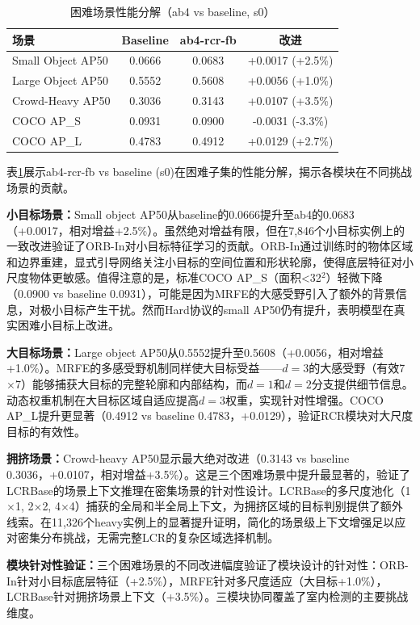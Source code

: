 \documentclass[journal]{IEEEtran}
\begin{document}
\begin{table}[t]
\caption{困难场景性能分解（ab4 vs baseline, s0）}
\label{tab:hard_breakdown}
\centering
\small
\begin{tabular}{lccc}
\toprule
\textbf{场景} & \textbf{Baseline} & \textbf{ab4-rcr-fb} & \textbf{改进} \\
\midrule
Small Object AP50 & 0.0666 & 0.0683 & +0.0017 (+2.5\%) \\
Large Object AP50 & 0.5552 & 0.5608 & +0.0056 (+1.0\%) \\
Crowd-Heavy AP50 & 0.3036 & 0.3143 & +0.0107 (+3.5\%) \\
COCO AP\_S & 0.0931 & 0.0900 & -0.0031 (-3.3\%) \\
COCO AP\_L & 0.4783 & 0.4912 & +0.0129 (+2.7\%) \\
\bottomrule
\end{tabular}
\end{table}

表\ref{tab:hard_breakdown}展示ab4-rcr-fb vs baseline (s0)在困难子集的性能分解，揭示各模块在不同挑战场景的贡献。

\textbf{小目标场景：}Small object AP50从baseline的0.0666提升至ab4的0.0683（+0.0017，相对增益+2.5\%）。虽然绝对增益有限，但在7,846个小目标实例上的一致改进验证了ORB-In对小目标特征学习的贡献。ORB-In通过训练时的物体区域和边界重建，显式引导网络关注小目标的空间位置和形状轮廓，使得底层特征对小尺度物体更敏感。值得注意的是，标准COCO AP\_S（面积<32$^2$）轻微下降（0.0900 vs baseline 0.0931），可能是因为MRFE的大感受野引入了额外的背景信息，对极小目标产生干扰。然而Hard协议的small AP50仍有提升，表明模型在真实困难小目标上改进。

\textbf{大目标场景：}Large object AP50从0.5552提升至0.5608（+0.0056，相对增益+1.0\%）。MRFE的多感受野机制同样使大目标受益——$d=3$的大感受野（有效7$\times$7）能够捕获大目标的完整轮廓和内部结构，而$d=1$和$d=2$分支提供细节信息。动态权重机制在大目标区域自适应提高$d=3$权重，实现针对性增强。COCO AP\_L提升更显著（0.4912 vs baseline 0.4783，+0.0129），验证RCR模块对大尺度目标的有效性。

\textbf{拥挤场景：}Crowd-heavy AP50显示最大绝对改进（0.3143 vs baseline 0.3036，+0.0107，相对增益+3.5\%）。这是三个困难场景中提升最显著的，验证了LCRBase的场景上下文推理在密集场景的针对性设计。LCRBase的多尺度池化（1$\times$1, 2$\times$2, 4$\times$4）捕获的全局和半全局上下文，为拥挤区域的目标判别提供了额外线索。在11,326个heavy实例上的显著提升证明，简化的场景级上下文增强足以应对密集分布挑战，无需完整LCR的复杂区域选择机制。

\textbf{模块针对性验证：}三个困难场景的不同改进幅度验证了模块设计的针对性：ORB-In针对小目标底层特征（+2.5\%），MRFE针对多尺度适应（大目标+1.0\%），LCRBase针对拥挤场景上下文（+3.5\%）。三模块协同覆盖了室内检测的主要挑战维度。
\end{document}
